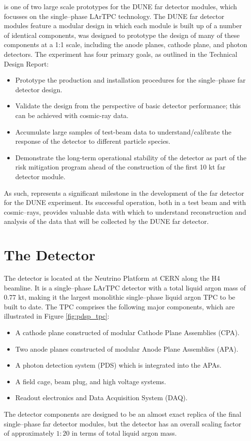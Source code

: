 \bigskip
\noindent
\protodune{} is one of two large scale prototypes for the DUNE far detector
modules, which focusses on the single--phase LArTPC technology. The DUNE far
detector modules feature a modular design in which each module is built up of a
number of identical components, \protodune{} was designed to prototype the
design of many of these components at a 1:1 scale, including the anode planes,
cathode plane, and photon detectors. The \protodune{} experiment has four 
primary goals, as outlined in the Technical Design Report\cite{Abi:2017aow}:
\begin{itemize}
	\item Prototype the production and installation procedures for the
		single--phase far detector design.
	\item Validate the design from the perspective of basic detector performance;
		this can be achieved with cosmic-ray data. 
	\item Accumulate large samples of test-beam data to understand/calibrate the
		response of the detector to different particle species.
	\item Demonstrate the long-term operational stability of the detector as part
		of the risk mitigation program ahead of the construction of the first 10 kt
		far detector module.
\end{itemize}
As such, \protodune{} represents a significant milestone in the development of
the far detector for the DUNE experiment. Its successful operation, both in a 
test beam and with cosmic--rays, provides valuable data with which to understand
reconstruction and analysis of the data that will be collected by the DUNE far 
detector.

\section{The \protodune{} Detector} \label{sec:pdsp_detector}

The \protodune{} detector is located at the Neutrino Platform at CERN along the
H4 beamline. It is a single--phase LArTPC detector with a total liquid argon 
mass of 0.77 kt, making it the largest monolithic single--phase liquid argon TPC
to be built to date. The TPC comprises the following major components, which 
are illustrated in Figure \ref{fig:pdsp_tpc}:
\begin{itemize}
	\item A cathode plane constructed of modular Cathode Plane Assemblies (CPA).
	\item Two anode planes constructed of modular Anode Plane Assemblies (APA).
	\item A photon detection system (PDS) which is integrated into the APAs.
	\item A field cage, beam plug, and high voltage systems.
	\item Readout electronics and Data Acquisition System (DAQ).
\end{itemize}
The detector components are designed to be an almost exact replica of the final 
single--phase far detector modules, but the detector has an overall scaling 
factor of approximately $1:20$ in terms of total liquid argon 
mass\cite{Abi:2017aow}.


